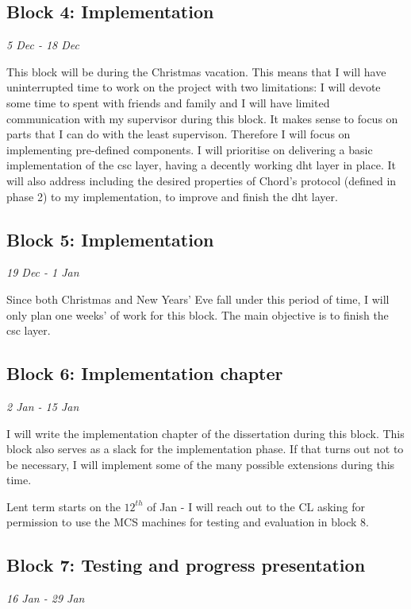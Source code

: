 \documentclass[12pt]{article}
\begin{document}
\subsection{Block 4: Implementation}
\emph{5 Dec - 18 Dec}  %

This block will be during the Christmas vacation. This means that I will have uninterrupted time to work on the project with two limitations: I will devote some time to spent with friends and family and I will have limited communication with my supervisor during this block. It makes sense to focus on parts that I can do with the least supervison. Therefore I will focus on implementing pre-defined components. I will prioritise on delivering a basic implementation of the \gls{csc} layer, having a decently working \gls{dht} layer in place. It will also address including the desired properties of Chord's protocol (defined in phase 2) to my implementation, to improve and finish the \gls{dht} layer.


\subsection{Block 5: Implementation}
\emph{19 Dec - 1 Jan}  %

Since both Christmas and New Years' Eve fall under this period of time, I will only plan one weeks' of work for this block. The main objective is to finish the \gls{csc} layer.


\subsection{Block 6: Implementation chapter}
\emph{2 Jan - 15 Jan}  %

I will write the implementation chapter of the dissertation during this block. This block also serves as a slack for the implementation phase. If that turns out not to be necessary, I will implement some of the many possible extensions during this time.

Lent term starts on the $12^{th}$ of Jan - I will reach out to the CL asking for permission to use the MCS machines for testing and evaluation in block 8.


\subsection{Block 7: Testing and progress presentation}
\emph{16 Jan - 29 Jan} %
\end{document}
